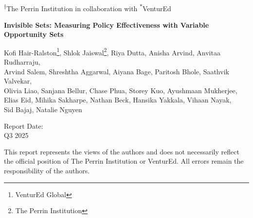 \documentclass[11pt,letterpaper]{report}
\theoremstyle{definition}
\theoremstyle{remark}
\begin{document}
\begin{titlepage}
\thispagestyle{titlepage}
\begin{center}

\vspace{1cm}

{\large \textsuperscript{$\dag$}{The Perrin Institution} {in collaboration with} \textsuperscript{$\ast$}{VenturEd}}

\vspace{3cm}

{\huge\bfseries Invisible Sets: Measuring Policy Effectiveness with Variable Opportunity Sets}

\vspace{1cm}


\vspace{2cm}

{\large
\renewcommand{\thefootnote}{\fnsymbol{footnote}}
Kofi Hair-Ralston\thanks{VenturEd Global}, Shlok Jaiswal\thanks{The Perrin Institution}, Riya Dutta\footnotemark[2], Anisha Arvind\footnotemark[2], Anvitaa Rudharraju\footnotemark[2],\\
Arvind Salem\footnotemark[2], Shreshtha Aggarwal\footnotemark[2], Aiyana Bage\footnotemark[2], Paritosh Bhole\footnotemark[2], Saathvik Valvekar\footnotemark[2],\\
Olivia Liao\footnotemark[2], Sanjana Bellur\footnotemark[2], Chase Phua\footnotemark[2], Storey Kuo\footnotemark[2], Ayushmaan Mukherjee\footnotemark[2],\\
Elias Eid\footnotemark[2], Mihika Sakharpe\footnotemark[2], Nathan Beck\footnotemark[2], Hansika Yakkala\footnotemark[2], Vihaan Nayak\footnotemark[2],\\
Sid Bajaj\footnotemark[2], Natalie Nguyen\footnotemark[2]
\renewcommand{\thefootnote}{\arabic{footnote}}
}

\vspace{1.5cm}

\vspace{1cm}

{\large Report Date:}\\
{\large Q3 2025}\\
\vspace{0.3cm}

\vfill

{\footnotesize\color{textgray}
This report represents the views of the authors and does not necessarily reflect the official position of The Perrin Institution or VenturEd. All errors remain the responsibility of the authors.
}

\end{center}
\end{titlepage}
\end{document}
